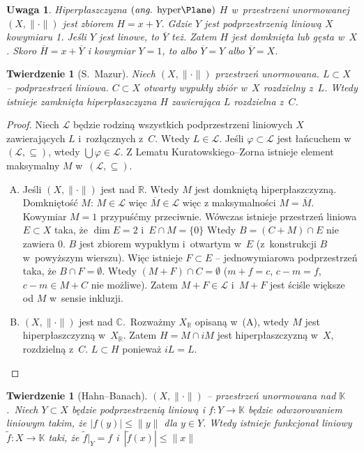 \documentclass[10pt]{article}
\renewcommand{\[}{\begin{equation}}
\renewcommand{\]}{\end{equation}}
\newcommand{\C}{{\ensuremath{\mathbb C}}}
\newcommand{\R}{{\ensuremath{\mathbb R}}}
\newcommand{\K}{\ensuremath{\mathbb{K}}}
\newcommand{\norm}{\|\cdot\|}
\newtheorem{twr}[subsubsection]{Twierdzenie}%
\newtheorem{uw}[subsubsection]{Uwaga}
\newcounter{numer}
\begin{document}
\begin{uw}
  Hiperpłaszczyzna $\left(\textrm{\textit{ang.} hyper\Plane}\right)$ $H$ w~przestrzeni unormowanej $(X,\|\cdot\|)$ jest zbiorem $H= x+Y$. Gdzie $Y$ jest podprzestrzenią liniową $X$ kowymiaru 1.
	Jeśli $Y$ jest linowe, to $\overline{Y}$ też. Zatem $H$ jest domknięta lub gęsta w~$X$. 
	Skoro $\overline{H}=x+\overline{Y}$ i kowymiar $Y=1$, to albo $\overline{Y} = Y$ albo $\overline{Y} = X$.
\end{uw}
\begin{twr}[S.~Mazur]
  \label{maz}
	Niech $(X,\|\cdot\|)$ przestrzeń unormowana. $L\subset X$ -- podprzestrzeń liniowa. 
	$C\subset X$ otwarty wypukły zbiór w~$X$ rozdzielny z~$L$. Wtedy istnieje zamknięta hiperpłaszczyzna $H$ zawierająca $L$ rozdzielna z~$C$.
\end{twr}
\begin{proof}
	Niech $\mathcal{L}$ będzie rodziną wszystkich podprzestrzeni liniowych $X$ zawierających $L$ i~rozłącznych z~$C$.
	Wtedy $L \in \mathcal{L}$. Jeśli $\varphi \subset \mathcal{L}$ jest łańcuchem w~$(\mathcal{L},\subseteq)$, wtedy $\bigcup \varphi\in \mathcal{L}$.
	Z Lematu Kuratowskiego--Zorna istnieje element maksymalny $M$ w~$(\mathcal{L}, \subseteq)$.
	\begin{enumerate}[(A)]
		\item Jeśli $(X,\|\cdot\|)$ jest nad \R. Wtedy $M$ jest domkniętą hiperpłaszczyzną.
			Domkniętość $M$: $M\in \mathcal{L}$ więc $\overline{M} \in \mathcal{L}$ więc z maksymalności $M=\overline{M}$.
			Kowymiar $M=1$ przypuśćmy przeciwnie. Wówczas istnieje przestrzeń liniowa $E\subset X$ taka, że $\dim E =2$ i~$E\cap M=\{0\}$
			Wtedy $B=(C+M)\cap E$ nie zawiera 0.
			$B$ jest zbiorem wypukłym i~otwartym w~$E$ (z~konstrukcji $B$ w~powyższym wierszu).
			Więc istnieje $F\subset E$ -- jednowymiarowa podprzestrzeń taka, że $B\cap F = \emptyset$.
			Wtedy $(M+F)\cap C= \emptyset $ ($m+f=c$, $c-m=f$, $c-m \in M+C$ nie możliwe).
			Zatem $M+F \in \mathcal{L}$ i~$M+F$ jest ściśle większe od $M$ w~sensie inkluzji.
		\item $(X,\norm)$ jest nad \C.~Rozważmy $X_\R$ opisaną w~(A), wtedy $M$ jest hiperpłaszczyzną w~$X_{\R}$.
			Zatem $H=M\cap iM$ jest hiperpłaszczyzną w~$X$, rozdzielną z~$C$. $L\subset H$ ponieważ $iL=L$.
	\end{enumerate}
\end{proof}
\begin{twr}[Hahn--Banach]
	$(X,\norm)$ -- przestrzeń unormowana nad \K.~Niech $Y\subset X$ będzie podprzestrzenią liniową i 
	$f:Y\to \K$ będzie odwzorowaniem liniowym takim, że $|f(y)| \le \|y\|$ dla $y\in Y$.
	Wtedy istnieje funkcjonał liniowy $\tilde{f} :X \to \K$ taki, że $\tilde{f}|_Y = f$ i~$|\tilde{f}(x)|\le \|x\|$
\end{twr}
\end{document}
